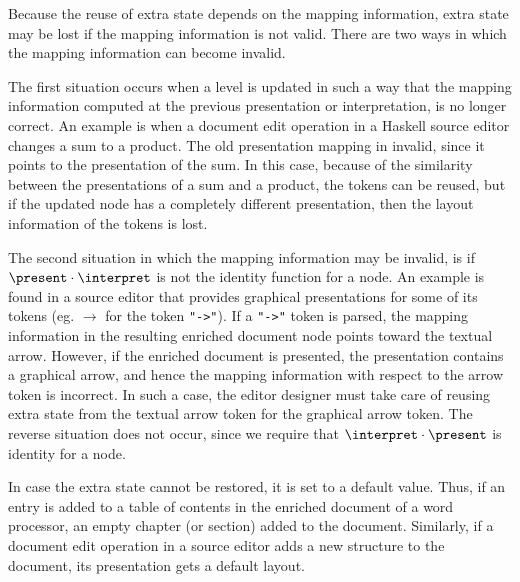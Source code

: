 Because the reuse of extra state depends on the mapping information, extra state may be lost if the mapping information is not valid. There are two ways in which the mapping information can become invalid.  

The first situation occurs when a level is updated in such a way that the mapping information computed at the previous presentation or interpretation, is no longer correct. An example is when a document edit operation in a Haskell source editor changes a sum to a product. The old presentation mapping in invalid, since it points to the presentation of the sum. In this case, because of the similarity between the presentations of a sum and a product, the tokens can be reused, but if the updated node has a completely different presentation, then the layout information of the tokens is lost. 

The second situation in which the mapping information may be invalid, is if 
$\present \cdot \interpret$ is not the identity function for a node.  An example is found in a source editor that provides graphical presentations for some of its tokens (eg. $\rightarrow$ for the token \verb|"->"|). If a \verb|"->"| token is parsed, the mapping information in the resulting enriched document node points toward the textual arrow. However, if the enriched document is presented, the presentation contains a graphical arrow, and hence the mapping information with respect to the arrow token is incorrect. In such a case, the editor designer must take care of reusing extra state from the textual arrow token for the graphical arrow token. The reverse situation does not occur, since we require that $\interpret \cdot \present$ is identity for a node. 

In case the extra state cannot be restored, it is set to a default value. Thus, if an entry is added to a table of contents in the enriched document of a word processor, an empty chapter (or section) added to the document. Similarly, if a document edit operation in a source editor adds a new structure to the document, its presentation gets a default layout.

